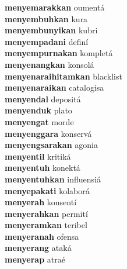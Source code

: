 \textbf{menyemarakkan } oumentá \\
\textbf{menyembuhkan } kura \\
\textbf{menyembunyikan } kubri \\
\textbf{menyempadani } definí \\
\textbf{menyempurnakan } kompletá \\
\textbf{menyenangkan } konsolá \\
\textbf{menyenaraihitamkan } blacklist \\
\textbf{menyenaraikan } catalogisa \\
\textbf{menyendal } depositá \\
\textbf{menyenduk } plato \\
\textbf{menyengat } morde \\
\textbf{menyenggara } konservá \\
\textbf{menyengsarakan } agonia \\
\textbf{menyentil } kritiká \\
\textbf{menyentuh } konektá \\
\textbf{menyentuhkan } influensiá \\
\textbf{menyepakati } kolaborá \\
\textbf{menyerah } konsentí \\
\textbf{menyerahkan } permití \\
\textbf{menyeramkan } teribel \\
\textbf{menyeranah } ofensa \\
\textbf{menyerang } ataká \\
\textbf{menyerap } atraé \\
